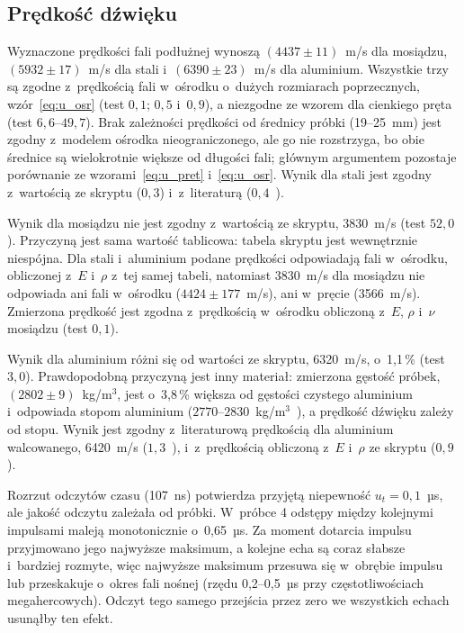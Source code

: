 \documentclass[12pt, a4paper]{article}
\begin{document}
\subsection{Prędkość dźwięku}

Wyznaczone prędkości fali podłużnej wynoszą $(4437 \pm 11)$~m/s dla mosiądzu,
$(5932 \pm 17)$~m/s dla stali i~$(6390 \pm 23)$~m/s dla aluminium. Wszystkie trzy są zgodne
z~prędkością fali w~ośrodku o~dużych rozmiarach poprzecznych, wzór~\eqref{eq:u_osr}
(test $0{,}1$; $0{,}5$ i~$0{,}9$), a niezgodne ze wzorem dla cienkiego pręta (test
$6{,}6$--$49{,}7$). Brak zależności prędkości od średnicy próbki (19--25~mm) jest zgodny
z~modelem ośrodka nieograniczonego, ale go nie rozstrzyga, bo obie średnice są wielokrotnie
większe od długości fali; głównym argumentem pozostaje porównanie ze wzorami~\eqref{eq:u_pret}
i~\eqref{eq:u_osr}. Wynik dla stali jest
zgodny z~wartością ze skryptu ($0{,}3$) i~z~literaturą ($0{,}4$~\cite{sound}).

Wynik dla mosiądzu nie jest zgodny z~wartością ze skryptu, 3830~m/s (test $52{,}0$). Przyczyną
jest sama wartość tablicowa: tabela skryptu jest wewnętrznie niespójna. Dla stali i~aluminium
podane prędkości odpowiadają fali w~ośrodku, obliczonej z~$E$ i~$\rho$ z~tej samej tabeli,
natomiast 3830~m/s dla mosiądzu nie odpowiada ani fali w~ośrodku ($4424 \pm 177$~m/s),
ani w~pręcie (3566~m/s). Zmierzona prędkość jest zgodna z~prędkością w~ośrodku obliczoną
z~$E$, $\rho$ i~$\nu$ mosiądzu (test $0{,}1$).

Wynik dla aluminium różni się od wartości ze skryptu, 6320~m/s, o~1,1\,\% (test $3{,}0$).
Prawdopodobną przyczyną jest inny materiał: zmierzona gęstość próbek, $(2802 \pm 9)$~kg/m$^3$, jest
o~3,8\,\% większa od gęstości czystego aluminium i~odpowiada stopom aluminium
($2770$--$2830$~kg/m$^3$~\cite{density}), a prędkość dźwięku zależy od stopu. Wynik jest
zgodny z~literaturową prędkością dla aluminium walcowanego, 6420~m/s ($1{,}3$~\cite{sound}),
i~z~prędkością obliczoną z~$E$ i~$\rho$ ze skryptu ($0{,}9$).

Rozrzut odczytów czasu (107~ns) potwierdza przyjętą niepewność $u_t = 0{,}1$~µs, ale jakość
odczytu zależała od próbki. W~próbce 4 odstępy między kolejnymi impulsami maleją monotonicznie
o~0,65~µs. Za moment dotarcia impulsu przyjmowano jego najwyższe maksimum, a kolejne echa są
coraz słabsze i~bardziej rozmyte, więc najwyższe maksimum przesuwa się w~obrębie impulsu
lub przeskakuje o~okres fali nośnej (rzędu 0,2--0,5~µs przy częstotliwościach
megahercowych). Odczyt tego samego przejścia przez zero we wszystkich echach usunąłby ten efekt.
\end{document}
